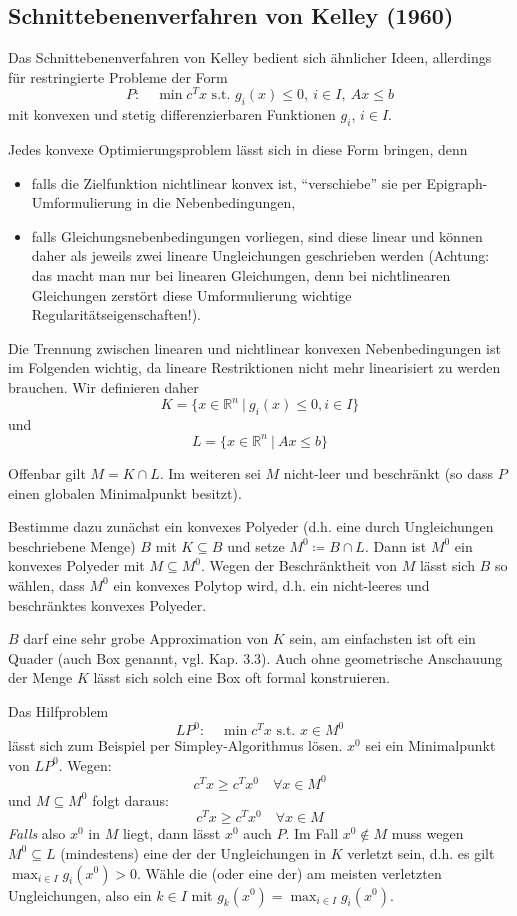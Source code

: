 \documentclass[12pt]{extreport} %
\newcommand{\R}{\mathbb{R}}
\theoremstyle{named}
\theoremstyle{nnamed}
\theoremstyle{itshape}
\theoremstyle{normal}
\begin{document}
\subsection*{Schnittebenenverfahren von Kelley (1960)}

Das Schnittebenenverfahren von Kelley bedient sich ähnlicher Ideen, allerdings für restringierte Probleme der Form
	$$ P: \quad \min c^T x \text{ s.t. } g_i(x) \leq 0, ~i \in I, ~ Ax \leq b $$
mit konvexen und stetig differenzierbaren Funktionen $g_i$, $i \in I$. ~\bigskip

Jedes konvexe Optimierungsproblem lässt sich in diese Form bringen, denn
\begin{itemize}
	\item falls die Zielfunktion nichtlinear konvex ist, \enquote{verschiebe} sie per Epigraph-Umformulierung in die Nebenbedingungen,
	\item falls Gleichungsnebenbedingungen vorliegen, sind diese linear und können daher als jeweils zwei lineare Ungleichungen geschrieben werden (Achtung: das macht man nur bei linearen Gleichungen, denn bei nichtlinearen Gleichungen zerstört diese Umformulierung wichtige Regularitätseigenschaften!).
\end{itemize}

Die Trennung zwischen linearen und nichtlinear konvexen Nebenbedingungen ist im Folgenden wichtig, da lineare Restriktionen nicht mehr linearisiert zu werden brauchen. Wir definieren daher
	$$ K = \big\{ x \in \R^n ~|~ g_i(x) \leq 0, i \in I \big\}$$
und
	$$ L = \big\{ x \in \R^n ~|~ Ax \leq b \big\} $$

Offenbar gilt $M = K \cap L$. Im weiteren sei $M$ nicht-leer und beschränkt (so dass $P$ einen globalen Minimalpunkt besitzt). ~\bigskip

Bestimme dazu zunächst ein konvexes Polyeder (d.h. eine durch Ungleichungen beschriebene Menge) $B$ mit $K \subseteq B$ und setze $M^0 \coloneqq B \cap L$. Dann ist $M^0$ ein konvexes Polyeder mit $M \subseteq M^0$. Wegen der Beschränktheit von $M$ lässt sich $B$ so wählen, dass $M^0$ ein konvexes Polytop wird, d.h. ein nicht-leeres und beschränktes konvexes Polyeder. ~\bigskip

$B$ darf eine sehr grobe Approximation von $K$ sein, am einfachsten ist oft ein Quader (auch Box genannt, vgl. Kap. 3.3). Auch ohne geometrische Anschauung der Menge $K$ lässt sich solch eine Box oft formal konstruieren. ~\bigskip

Das Hilfproblem
	$$ LP^0: \quad \min c^Tx \text{ s.t. } x \in M^0 $$
lässt sich zum Beispiel per Simpley-Algorithmus lösen. $x^0$ sei ein Minimalpunkt von $LP^0$. Wegen:
	$$ c^T x \geq c^T x^0 \quad \forall x \in M^0 $$
und $M \subseteq M^0$ folgt daraus:
	$$ c^T x \geq c^T x^0 \quad \forall x \in M $$
\textit{Falls} also $x^0$ in $M$ liegt, dann lässt $x^0$ auch $P$. Im Fall $x^0 \notin M$ muss wegen $M^0 \subseteq L$ (mindestens) eine der der Ungleichungen in $K$ verletzt sein, d.h. es gilt $\max_{i \in I} g_i(x^0) > 0$. Wähle die (oder eine der) am meisten verletzten Ungleichungen, also ein $k \in I$ mit $g_k(x^0) = \max_{i \in I} g_i(x^0)$. ~\bigskip
\end{document}
